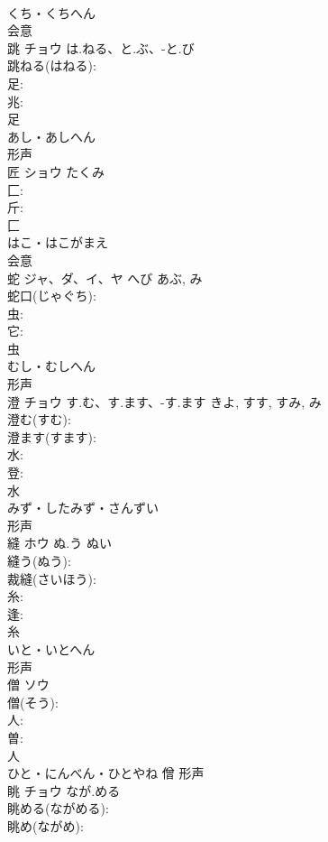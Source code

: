 \documentclass[8pt]{extreport}
\begin{document}
\begin{CJK}{UTF8}{min}
\\	くち・くちへん	
\\	会意 
\\	跳	チョウ	は.ねる、と.ぶ、-と.び		
\\	跳ねる(はねる): 
\\	足: 
\\	兆: 
\\	足	
\\	あし・あしへん	
\\	形声 
\\	匠	ショウ	たくみ		
\\	匚: 
\\	斤: 
\\	匚	
\\	はこ・はこがまえ	
\\	会意 
\\	蛇	ジャ、ダ、イ、ヤ	へび	あぶ, み	
\\	蛇口(じゃぐち): 
\\	虫: 
\\	它: 
\\	虫	
\\	むし・むしへん	
\\	形声 
\\	澄	チョウ	す.む、す.ます、-す.ます	きよ, すす, すみ, み	
\\	澄む(すむ): 
\\	澄ます(すます): 
\\	水: 
\\	登: 
\\	水	
\\	みず・したみず・さんずい	
\\	形声 
\\	縫	ホウ	ぬ.う	ぬい	
\\	縫う(ぬう): 
\\	裁縫(さいほう): 
\\	糸: 
\\	逢: 
\\	糸	
\\	いと・いとへん	
\\	形声 
\\	僧	ソウ			
\\	僧(そう): 
\\	人: 
\\	曽: 
\\	人	
\\	ひと・にんべん・ひとやね	僧	形声 
\\	眺	チョウ	なが.める		
\\	眺める(ながめる): 
\\	眺め(ながめ): 

\end{CJK}
\end{document}
